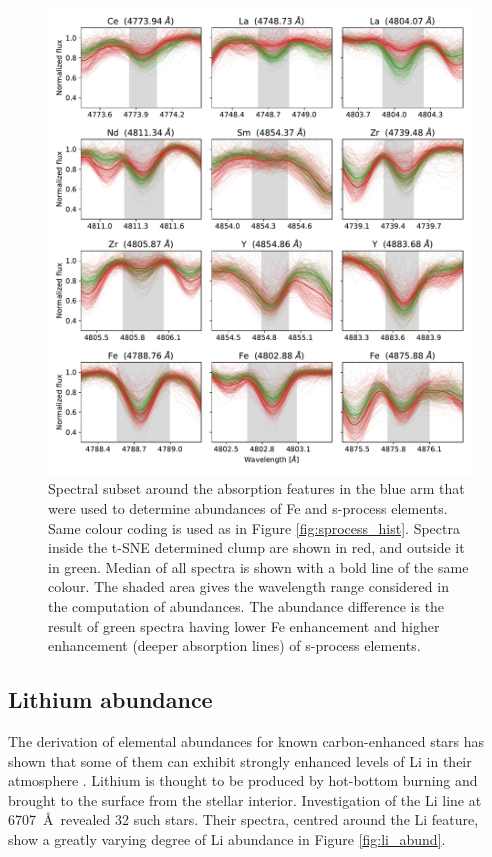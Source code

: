 \begin{figure}
	\centering
	\includegraphics[width=\textwidth]{sprocess_spectra.pdf}
	\caption{Spectral subset around the absorption features in the blue arm that were used to determine abundances of Fe and s-process elements. Same colour coding is used as in Figure \ref{fig:sprocess_hist}. Spectra inside the t-SNE determined clump are shown in red, and outside it in green. Median of all spectra is shown with a bold line of the same colour. The shaded area gives the wavelength range considered in the computation of abundances. The abundance difference is the result of green spectra having lower Fe enhancement and higher enhancement (deeper absorption lines) of s-process elements.}
	\label{fig:sprocess_spectrum}
\end{figure} 

\subsection{Lithium abundance}
\label{sec:lithium}
The derivation of elemental abundances for known carbon-enhanced stars has shown that some of them can exhibit strongly enhanced levels of Li in their atmosphere \cite{1991A&A...245L...1A}. Lithium is thought to be produced by hot-bottom burning \cite{1974ApJ...187..555S} and brought to the surface from the stellar interior. Investigation of the Li line at 6707~\AA\ revealed 32 such stars. Their spectra, centred around the Li feature, show a greatly varying degree of Li abundance in Figure \ref{fig:li_abund}.

